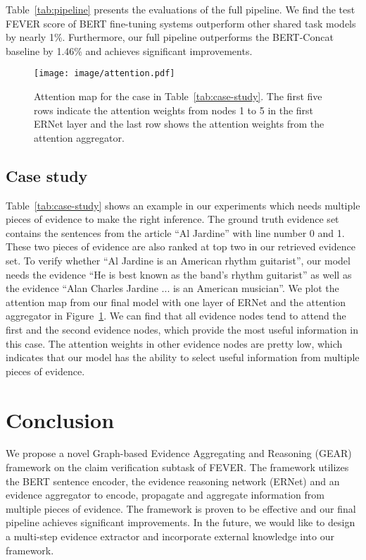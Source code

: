 \documentclass[11pt,a4paper]{article}
\begin{document}
Table~\ref{tab:pipeline} presents the evaluations of the full pipeline. We find the test FEVER score of BERT fine-tuning systems outperform other shared task models by nearly 1\%. Furthermore, our full pipeline outperforms the BERT-Concat baseline by 1.46\% and achieves significant improvements.


\begin{figure}[t]
    \centering
    \texttt{[image: image/attention.pdf]}
    \caption{Attention map for the case in Table~\ref{tab:case-study}. The first five rows indicate the attention weights from nodes 1 to 5 in the first ERNet layer and the last row shows the attention weights from the attention aggregator.}
    \label{fig:case-attention}
\end{figure}

\subsection{Case study}

Table~\ref{tab:case-study} shows an example in our experiments which needs multiple pieces of evidence to make the right inference. 
The ground truth evidence set contains the sentences from the article ``Al Jardine'' with line number 0 and 1. These two pieces of evidence are also ranked at top two in our retrieved evidence set. To verify whether ``Al Jardine is an American rhythm guitarist'', our model needs the evidence ``He is best known as the band’s rhythm guitarist'' as well as the evidence ``Alan Charles Jardine ... is an American musician''.  We plot the attention map from our final model with one layer of ERNet and the attention aggregator in Figure~\ref{fig:case-attention}. We can find that all evidence nodes tend to attend the first and the second evidence nodes, which provide the most useful information in this case. The attention weights in other evidence nodes are pretty low, which indicates that our model has the ability to select useful information from multiple pieces of evidence. 


\section{Conclusion}
We propose a novel Graph-based Evidence Aggregating and Reasoning (GEAR) framework on the claim verification subtask of FEVER. The framework utilizes the BERT sentence encoder, the evidence reasoning network (ERNet) and an evidence aggregator to encode, propagate and aggregate information from multiple pieces of evidence. The framework is proven to be effective and our final pipeline achieves significant improvements. In the future, we would like to design a multi-step evidence extractor and incorporate external knowledge into our framework.
\end{document}
